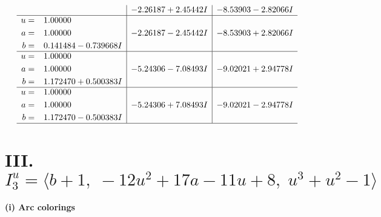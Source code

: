 \documentclass[1p]{elsarticle_modified}
\theoremstyle{definition}
\begin{document}
$$\begin{array}{c|c|c}
 & -2.26187 + 2.45442 I & -8.53903 - 2.82066 I \\ \hline\begin{aligned}
u &= \phantom{-}1.00000\phantom{ +0.000000I} \\
a &= \phantom{-}1.00000\phantom{ +0.000000I} \\
b &= \phantom{-}0.141484 - 0.739668 I\end{aligned}
 & -2.26187 - 2.45442 I & -8.53903 + 2.82066 I \\ \hline\begin{aligned}
u &= \phantom{-}1.00000\phantom{ +0.000000I} \\
a &= \phantom{-}1.00000\phantom{ +0.000000I} \\
b &= \phantom{-}1.172470 + 0.500383 I\end{aligned}
 & -5.24306 - 7.08493 I & -9.02021 + 2.94778 I \\ \hline\begin{aligned}
u &= \phantom{-}1.00000\phantom{ +0.000000I} \\
a &= \phantom{-}1.00000\phantom{ +0.000000I} \\
b &= \phantom{-}1.172470 - 0.500383 I\end{aligned}
 & -5.24306 + 7.08493 I & -9.02021 - 2.94778 I\\
 \hline 
 \end{array}$$\newpage\newpage\renewcommand{\arraystretch}{1}
\centering \section*{III. $I^u_{3}= \langle b+1,\;-12 u^2+17 a-11 u+8,\;u^3+u^2-1 \rangle$}
\flushleft \textbf{(i) Arc colorings}\\
\end{document}
